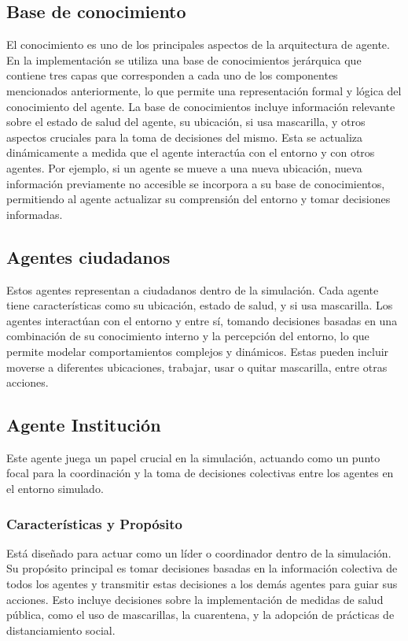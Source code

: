 \subsection{Base de conocimiento}
El conocimiento es uno de los principales aspectos de la arquitectura de agente. En la implementación se utiliza una base de conocimientos jerárquica que contiene tres capas que corresponden a cada uno de los componentes mencionados anteriormente, lo que permite una representación formal y lógica del conocimiento del agente. La base de conocimientos incluye información relevante sobre el estado de salud del agente, su ubicación, si usa mascarilla, y otros aspectos cruciales para la toma de decisiones del mismo. Esta se actualiza dinámicamente a medida que el agente interactúa con el entorno y con otros agentes. Por ejemplo, si un agente se mueve a una nueva ubicación, nueva información previamente no accesible se incorpora a su base de conocimientos, permitiendo al agente actualizar su comprensión del entorno y tomar decisiones informadas.

\subsection{Agentes ciudadanos}
Estos agentes representan a ciudadanos dentro de la simulación. Cada agente tiene características como su ubicación, estado de salud, y si usa mascarilla. Los agentes interactúan con el entorno y entre sí, tomando decisiones basadas en una combinación de su conocimiento interno y la percepción del entorno, lo que permite modelar comportamientos complejos y dinámicos. Estas pueden incluir moverse a diferentes ubicaciones, trabajar, usar o quitar mascarilla, entre otras acciones.

\subsection{Agente Institución}
Este agente juega un papel crucial en la simulación, actuando como un punto focal para la coordinación y la toma de decisiones colectivas entre los agentes en el entorno simulado.

\subsubsection{Características y Propósito}
Está diseñado para actuar como un líder o coordinador dentro de la simulación. Su propósito principal es tomar decisiones basadas en la información colectiva de todos los agentes y transmitir estas decisiones a los demás agentes para guiar sus acciones. Esto incluye decisiones sobre la implementación de medidas de salud pública, como el uso de mascarillas, la cuarentena, y la adopción de prácticas de distanciamiento social.

